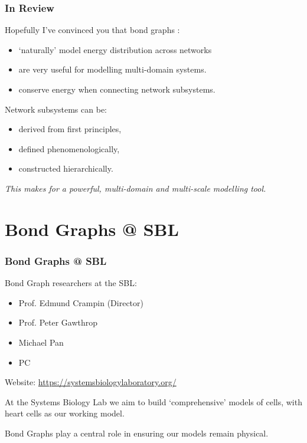 \begin{frame}
\frametitle{In Review}
Hopefully I've convinced you that bond graphs :
\begin{itemize}
	\item `naturally' model energy distribution across networks
	\item are very useful for modelling multi-domain systems.
	\item conserve energy when connecting network subsystems.
\end{itemize}
\vspace{22pt}

Network subsystems can be:
\begin{itemize}
	\item derived from first principles,
	\item defined phenomenologically, 
	\item constructed hierarchically.
\end{itemize}
\emph{This makes for a powerful, multi-domain and multi-scale modelling tool.}
\end{frame}
\section{Bond Graphs @ SBL}
\begin{frame}
\frametitle{Bond Graphs @ SBL}
Bond Graph researchers at the SBL:
\begin{itemize}
	\item Prof. Edmund Crampin (Director)
	\item Prof. Peter Gawthrop
	\item Michael Pan
	\item PC
\end{itemize}
\begin{small}

Website: \url{https://systemsbiologylaboratory.org/}\\
	\vspace{10pt}
	
At the Systems Biology Lab we aim to build `comprehensive' models of cells, with heart cells as our working model.\\
\vspace{10pt}

Bond Graphs play a central role in ensuring our models remain physical.
\end{small}
\end{frame}


